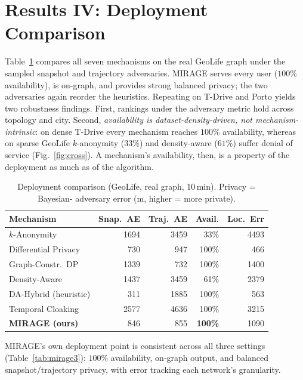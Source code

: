 \documentclass[10pt,journal,compsoc]{IEEEtran}
\begin{document}
\section{Results IV: Deployment Comparison}
\label{sec:deploy}
Table~\ref{tab:main} compares all seven mechanisms on the real GeoLife graph under
the sampled snapshot and trajectory adversaries. MIRAGE serves every user
($100\%$ availability), is on-graph, and provides strong balanced privacy; the two
adversaries again reorder the heuristics. Repeating on T-Drive and Porto yields two
robustness findings. First, rankings under the adversary metric hold across
topology and city. Second, \emph{availability is dataset-density-driven, not
mechanism-intrinsic}: on dense T-Drive every mechanism reaches $100\%$
availability, whereas on sparse GeoLife $k$-anonymity ($33\%$) and density-aware
($61\%$) suffer denial of service (Fig.~\ref{fig:cross}). A mechanism's
availability, then, is a property of the deployment as much as of the algorithm.

\begin{table}[t]\centering
\caption{Deployment comparison (GeoLife, real graph, 10\,min). Privacy = Bayesian-
adversary error (m, higher = more private).}
\label{tab:main}
\begin{tabular}{lrrrr}
\toprule
Mechanism & Snap.\ AE & Traj.\ AE & Avail. & Loc.\ Err \\
\midrule
$k$-Anonymity & 1694 & 3459 & 33\% & 4493 \\
Differential Privacy & 730 & 947 & 100\% & 466 \\
Graph-Constr.\ DP & 1339 & 732 & 100\% & 1400 \\
Density-Aware & 1437 & 3459 & 61\% & 2379 \\
DA-Hybrid (heuristic) & 311 & 1885 & 100\% & 563 \\
Temporal Cloaking & 2577 & 4636 & 100\% & 3215 \\
\textbf{MIRAGE (ours)} & 846 & 855 & \textbf{100\%} & 1090 \\
\bottomrule
\end{tabular}
\end{table}

MIRAGE's own deployment point is consistent across all three settings
(Table~\ref{tab:mirage3}): $100\%$ availability, on-graph output, and balanced
snapshot/trajectory privacy, with error tracking each network's granularity.
\end{document}
